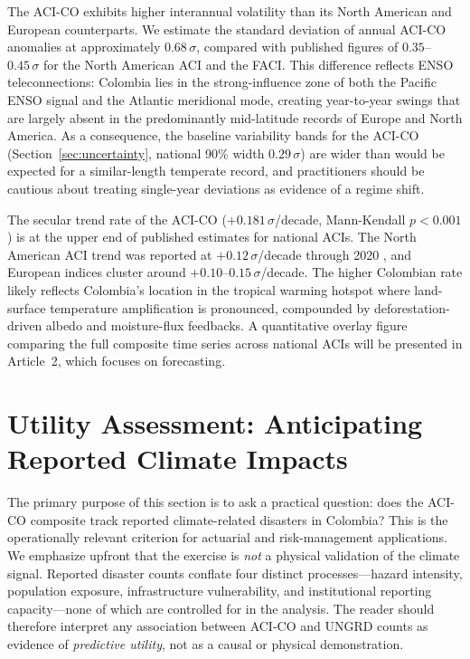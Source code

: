 \documentclass[12pt]{article}
\begin{document}
The ACI-CO exhibits higher interannual volatility than its North American and European counterparts. We estimate the standard deviation of annual ACI-CO anomalies at approximately $0.68\,\sigma$, compared with published figures of $0.35$--$0.45\,\sigma$ for the North American ACI and the FACI. This difference reflects ENSO teleconnections: Colombia lies in the strong-influence zone of both the Pacific ENSO signal and the Atlantic meridional mode, creating year-to-year swings that are largely absent in the predominantly mid-latitude records of Europe and North America. As a consequence, the baseline variability bands for the ACI-CO (Section~\ref{sec:uncertainty}, national 90\% width $0.29\,\sigma$) are wider than would be expected for a similar-length temperate record, and practitioners should be cautious about treating single-year deviations as evidence of a regime shift.

The secular trend rate of the ACI-CO ($+0.181\,\sigma$/decade, Mann-Kendall $p < 0.001$) is at the upper end of published estimates for national ACIs. The North American ACI trend was reported at $+0.12\,\sigma$/decade through 2020 \citep{aci2016}, and European indices cluster around $+0.10$--$0.15\,\sigma$/decade. The higher Colombian rate likely reflects Colombia's location in the tropical warming hotspot where land-surface temperature amplification is pronounced, compounded by deforestation-driven albedo and moisture-flux feedbacks. A quantitative overlay figure comparing the full composite time series across national ACIs will be presented in Article~2, which focuses on forecasting.
 
\section{Utility Assessment: Anticipating Reported Climate Impacts}\label{sec:validation}

The primary purpose of this section is to ask a practical question: does the ACI-CO composite track reported climate-related disasters in Colombia? This is the operationally relevant criterion for actuarial and risk-management applications. We emphasize upfront that the exercise is \emph{not} a physical validation of the climate signal. Reported disaster counts conflate four distinct processes---hazard intensity, population exposure, infrastructure vulnerability, and institutional reporting capacity---none of which are controlled for in the analysis. The reader should therefore interpret any association between ACI-CO and UNGRD counts as evidence of \emph{predictive utility}, not as a causal or physical demonstration.
\end{document}

